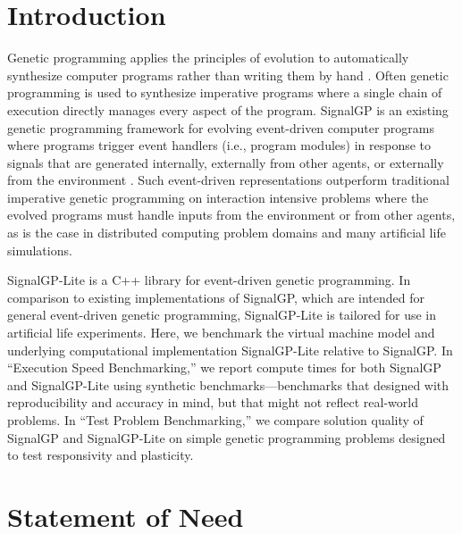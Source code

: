 \section{Introduction}

Genetic programming applies the principles of evolution to automatically synthesize computer programs rather than writing them by hand \citep{banzhaf1998genetic}.
Often genetic programming is used to synthesize imperative programs where a single chain of execution directly manages every aspect of the program.
SignalGP is an existing genetic programming framework for evolving event-driven computer programs where programs trigger event handlers (i.e., program modules) in response to signals that are generated internally, externally from other agents, or externally from the environment \citep{lalejini2018evolving}.
Such event-driven representations outperform traditional imperative genetic programming on interaction intensive problems where the evolved programs must handle inputs from the environment or from other agents, as is the case in distributed computing problem domains and many artificial life simulations.

SignalGP-Lite is a C++ library for event-driven genetic programming.
In comparison to existing implementations of SignalGP, which are intended for general event-driven genetic programming, SignalGP-Lite is tailored for use in artificial life experiments.
Here, we benchmark the virtual machine model and underlying computational implementation SignalGP-Lite relative to SignalGP.
In ``Execution Speed Benchmarking,'' we report compute times for both SignalGP and SignalGP-Lite using synthetic benchmarks---benchmarks that designed with reproducibility and accuracy in mind, but that might not reflect real-world problems.
In ``Test Problem Benchmarking,'' we compare solution quality of SignalGP and SignalGP-Lite on simple genetic programming problems designed to test responsivity and plasticity.

\section{Statement of Need}

